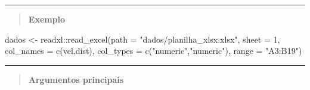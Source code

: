 \documentclass[
]{book}
\newenvironment{Shaded}{\begin{snugshade}}{\end{snugshade}}
\newcommand{\AttributeTok}[1]{\textcolor[rgb]{0.77,0.63,0.00}{#1}}
\newcommand{\DecValTok}[1]{\textcolor[rgb]{0.00,0.00,0.81}{#1}}
\newcommand{\FunctionTok}[1]{\textcolor[rgb]{0.00,0.00,0.00}{#1}}
\newcommand{\NormalTok}[1]{#1}
\newcommand{\OtherTok}[1]{\textcolor[rgb]{0.56,0.35,0.01}{#1}}
\newcommand{\SpecialCharTok}[1]{\textcolor[rgb]{0.00,0.00,0.00}{#1}}
\newcommand{\StringTok}[1]{\textcolor[rgb]{0.31,0.60,0.02}{#1}}
\theoremstyle{definition}
\theoremstyle{definition}
\theoremstyle{definition}
\theoremstyle{definition}
\theoremstyle{remark}
\begin{document}
\begin{center}\rule{0.5\linewidth}{0.5pt}\end{center}

\begin{quote}
\textbf{Exemplo}
\end{quote}

\begin{Shaded}
\begin{Highlighting}[]
\NormalTok{   dados }\OtherTok{\textless{}{-}}\NormalTok{ readxl}\SpecialCharTok{::}\FunctionTok{read\_excel}\NormalTok{(}\AttributeTok{path =} \StringTok{"dados/planilha\_xlsx.xlsx"}\NormalTok{,}
                   \AttributeTok{sheet =} \DecValTok{1}\NormalTok{,}
                   \AttributeTok{col\_names =} \FunctionTok{c}\NormalTok{(}\StringTok{\textquotesingle{}vel\textquotesingle{}}\NormalTok{,}\StringTok{\textquotesingle{}dist\textquotesingle{}}\NormalTok{),}
                   \AttributeTok{col\_types =} \FunctionTok{c}\NormalTok{(}\StringTok{"numeric"}\NormalTok{,}\StringTok{"numeric"}\NormalTok{),}
                   \AttributeTok{range =} \StringTok{"A3:B19"}\NormalTok{)}
\end{Highlighting}
\end{Shaded}

\begin{center}\rule{0.5\linewidth}{0.5pt}\end{center}

\begin{quote}
\textbf{Argumentos principais}
\end{quote}
\end{document}
